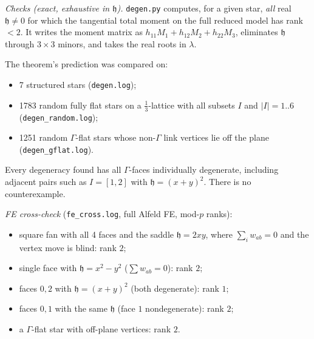\documentclass[11pt]{article}
\theoremstyle{definition}
\newcommand{\hh}{\mathfrak h}
\begin{document}
\emph{Checks (exact, exhaustive in $\hh$).} \texttt{degen.py} computes, for a given star, \emph{all} real $\hh\ne0$ for which the tangential total moment on the full reduced model has rank $<2$. It writes the moment matrix as $h_{11}M_1+h_{12}M_2+h_{22}M_3$, eliminates $\hh$ through $3\times3$ minors, and takes the real roots in $\lambda$.

The theorem's prediction was compared on:
\begin{itemize}[leftmargin=1.2em]
\item 7 structured stars (\texttt{degen.log});
\item 1783 random fully flat stars on a $\frac13$-lattice with all subsets $I$ and $|I|=1..6$ (\texttt{degen\_random.log});
\item 1251 random $\Gamma$-flat stars whose non-$\Gamma$ link vertices lie off the plane (\texttt{degen\_gflat.log}).
\end{itemize}
Every degeneracy found has all $\Gamma$-faces individually degenerate, including adjacent pairs such as $I=[1,2]$ with $\hh=(x+y)^2$. There is no counterexample.

\emph{FE cross-check} (\texttt{fe\_cross.log}, full Alfeld FE, mod-$p$ ranks):
\begin{itemize}[leftmargin=1.2em]
\item square fan with all 4 faces and the saddle $\hh=2xy$, where $\sum_iw_{ab}=0$ and the vertex move is blind: rank $2$;
\item single face with $\hh=x^2-y^2$ ($\sum w_{ab}=0$): rank $2$;
\item faces $0,2$ with $\hh=(x+y)^2$ (both degenerate): rank $1$;
\item faces $0,1$ with the same $\hh$ (face $1$ nondegenerate): rank $2$;
\item a $\Gamma$-flat star with off-plane vertices: rank $2$.
\end{itemize}

\end{document}
